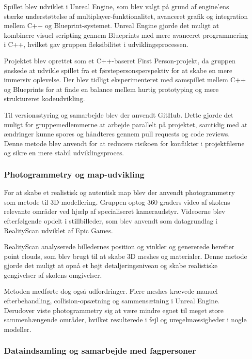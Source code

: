 Spillet blev udviklet i Unreal Engine, som blev valgt på grund af engine’ens stærke understøttelse af multiplayer-funktionalitet, avanceret grafik og integration mellem C++ og Blueprint-systemet. Unreal Engine gjorde det muligt at kombinere visuel scripting gennem Blueprints med mere avanceret programmering i C++, hvilket gav gruppen fleksibilitet i udviklingsprocessen.

Projektet blev oprettet som et C++-baseret First Person-projekt, da gruppen ønskede at udvikle spillet fra et førstepersonsperspektiv for at skabe en mere immersiv oplevelse. Der blev tidligt eksperimenteret med samspillet mellem C++ og Blueprints for at finde en balance mellem hurtig prototyping og mere struktureret kodeudvikling.

Til versionsstyring og samarbejde blev der anvendt GitHub. Dette gjorde det muligt for gruppemedlemmerne at arbejde parallelt på projektet, samtidig med at ændringer kunne spores og håndteres gennem pull requests og code reviews. Denne metode blev anvendt for at reducere risikoen for konflikter i projektfilerne og sikre en mere stabil udviklingsproces.


\subsubsection{Photogrammetry og map-udvikling}

For at skabe et realistisk og autentisk map blev der anvendt photogrammetry som metode til 3D-modellering. Gruppen optog 360-graders video af skolens relevante områder ved hjælp af specialiseret kameraudstyr. Videoerne blev efterfølgende opdelt i stillbilleder, som blev anvendt som datagrundlag i RealityScan udviklet af Epic Games.

RealityScan analyserede billedernes position og vinkler og genererede herefter point clouds, som blev brugt til at skabe 3D meshes og materialer. Denne metode gjorde det muligt at opnå et højt detaljeringsniveau og skabe realistiske gengivelser af skolens omgivelser.

Metoden medførte dog også udfordringer. Flere meshes krævede manuel efterbehandling, collision-opsætning og sammensætning i Unreal Engine. Derudover viste photogrammetry sig at være mindre egnet til meget store sammenhængende områder, hvilket resulterede i fejl og uregelmæssigheder i nogle modeller.

\subsubsection{Dataindsamling og samarbejde med fagpersoner}

